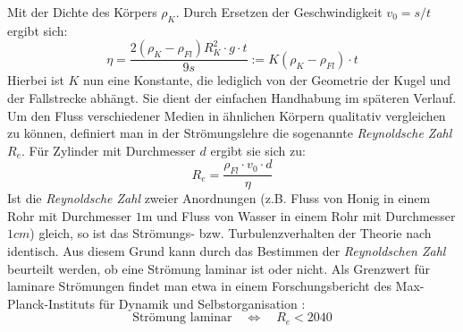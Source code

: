 Mit der Dichte des Körpers $\rho_K$. Durch Ersetzen der Geschwindigkeit $v_0 = s / t$ ergibt sich:
\begin{equation}
  \eta = \frac{2 (\rho_K - \rho_{Fl}) R_K^2 \cdot  g \cdot t}{9  s} := K (\rho_K - \rho_{Fl}) \cdot t
  \label{eq: eta}
\end{equation}
Hierbei ist $K$ nun eine Konstante, die lediglich von der Geometrie der Kugel und der Fallstrecke abhängt. Sie dient der einfachen Handhabung im späteren Verlauf.\\

Um den Fluss verschiedener Medien in ähnlichen Körpern qualitativ vergleichen zu können, definiert man in der Strömungslehre die sogenannte \emph{Reynoldsche Zahl} $R_e$. Für
Zylinder mit Durchmesser $d$ ergibt sie sich zu:
\begin{equation}
  R_e = \frac{\rho_{Fl} \cdot v_0 \cdot d}{\eta}
  \label{eq: reynolds}
\end{equation}
Ist die \emph{Reynoldsche Zahl} zweier Anordnungen (z.B. Fluss von Honig in einem Rohr mit Durchmesser $1 \si{\meter}$ und Fluss von Wasser in einem Rohr mit Durchmesser $1\si{cm}$) gleich, so
ist das Strömungs- bzw. Turbulenzverhalten der Theorie nach identisch. Aus diesem Grund kann durch das Bestimmen der \emph{Reynoldschen Zahl} beurteilt werden, ob eine Strömung laminar ist oder nicht.
Als Grenzwert für laminare Strömungen findet man etwa in einem Forschungsbericht des Max-Planck-Instituts für Dynamik und Selbstorganisation \cite{rey}:
\begin{equation}
  \text{Strömung laminar} \quad \Leftrightarrow \quad R_e < 2040
  \label{eq: laminar}
\end{equation}
